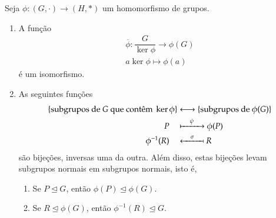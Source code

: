 \begin{teorema}\label{teorema_isomorfismo}
	Seja $\phi : (G, \cdot) \to (H, *)$ um homomorfismo de grupos.
	\begin{enumerate}[label=({\roman*})]
		\item A fun\c{c}\~ao
		\begin{align*}
			\overline{\phi} : \dfrac{G}{\ker\phi} \to \phi(G)\\
			a\ker\phi \mapsto \phi(a)
		\end{align*}
		\'e um isomorfismo.

		\item As seguintes fun\c{c}\~oes
		\begin{align*}
			\{\mbox{subgrupos de } G \mbox{ que cont\^em } \ker\phi\} &\longleftrightarrow \{\mbox{subgrupos de } \phi(G)\}\\
			P\quad &\xmapsto{\quad\psi\quad} \phi(P)\\
			\phi^{-1}(R)\quad &\xmapsfrom{\quad\sigma\quad} R
		\end{align*}
		s\~ao bije\c{c}\~oes, inversas uma da outra. Al\'em disso, estas bije\c{c}\~oes levam subgrupos normais em subgrupos normais, isto \'e,
		\begin{enumerate}[label=({\alph*})]
			\item Se $P \unlhd G$, ent\~ao $\phi(P) \unlhd \phi(G)$.

			\item Se $R \unlhd \phi(G)$, ent\~ao $\phi^{-1}(R) \unlhd G$.
		\end{enumerate}
	\end{enumerate}
\end{teorema}
